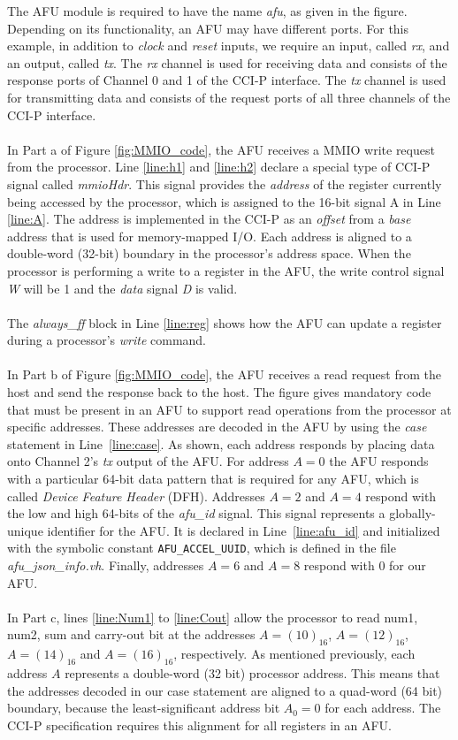 \documentclass[11pt, twoside, pdftex]{article}
\begin{document}
\noindent
The AFU module is required to have the name {\it afu}, as given in the figure. Depending on its functionality, an AFU may have different ports. For this example, in addition to {\it clock} and {\it reset} inputs, we require an input, called {\it rx}, and an output, called {\it tx}. The {\it rx} channel is used for receiving data and consists of the response ports of Channel 0 and 1 of the CCI-P interface. The {\it tx} channel is used for transmitting data and consists of the request ports of all three channels of the CCI-P interface.\\
\\
In Part a of Figure \ref{fig:MMIO_code}, the AFU receives a MMIO write request from the processor. Line \ref{line:h1} and \ref{line:h2} declare a special type of CCI-P signal called {\it mmioHdr}. This signal provides the {\it address} of the register currently being accessed by the processor, which is assigned to the 16-bit signal A in Line \ref{line:A}. The address is implemented in the CCI-P as an {\it offset} from a {\it base} address that is used for memory-mapped I/O. Each address is aligned to a double-word (32-bit) boundary in the processor's address space. When the processor is performing a write to a register in the AFU, the write control signal {\it W} will be 1 and the {\it data} signal {\it D} is valid.  \\
\\
The {\it always\_ff} block in Line \ref{line:reg} shows how the AFU can update a register during a processor's {\it write} command.\\
\\
In Part b of Figure \ref{fig:MMIO_code}, the AFU receives a read request from the host and send the response back to the host. The figure gives mandatory code that must be present in an AFU to support read operations from the processor at specific addresses. These addresses are decoded
in the AFU by using the {\it case} statement in Line~\ref{line:case}. As shown, each
address responds by placing data onto Channel 2's {\it tx} output of the AFU. For address $A = 0$
the AFU responds with a particular 64-bit data pattern that is required for any AFU, which is called {\it Device Feature Header} (DFH). Addresses
$A=2$ and $A=4$ respond with the low and high 64-bits of the {\it afu\_id} signal. This signal
represents a globally-unique identifier for the AFU. It is declared in Line~\ref{line:afu_id}
and initialized with the symbolic constant \texttt{AFU\_ACCEL\_UUID}, which is
defined in the file {\it afu\_json\_info.vh}.  Finally, addresses $A=6$ and $A=8$
respond with 0 for our AFU.\\
\\
In Part c, lines \ref{line:Num1} to \ref{line:Cout} allow the processor to read num1, num2, sum and carry-out bit at the addresses $A=(10)_{16}$, $A=(12)_{16}$, $A=(14)_{16}$ and $A=(16)_{16}$, respectively. As mentioned previously, each address $A$ represents a double-word (32 bit) processor address. This means that the addresses decoded in our case statement are aligned to a quad-word (64 bit) boundary, because the least-significant address bit $A_0 =0$ for each address. The CCI-P specification requires this alignment for all registers in an AFU.\\
\end{document}

